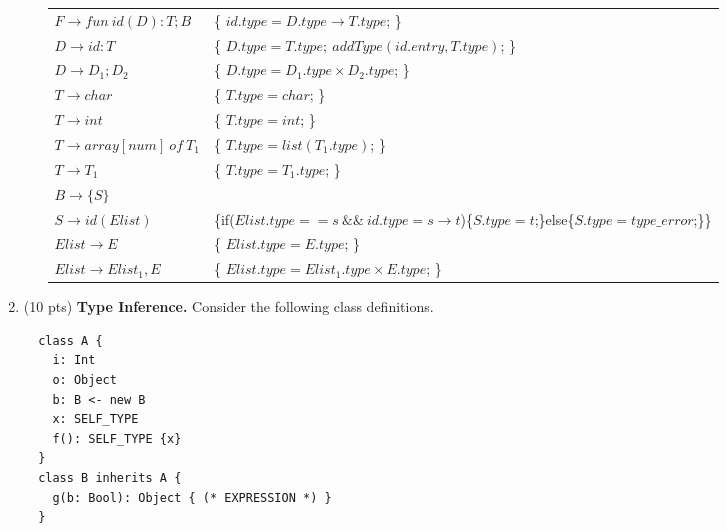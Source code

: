 \documentclass[10pt]{article}
\begin{document}
\begin{enumerate}
\begin{itemize}
{                        \begin{tabular}{ll}
                            $F \rightarrow fun\ id(D):T;B$      & \{ $id.type=D.type\rightarrow T.type$; \}                                                         \\
                            $D \rightarrow id:T$                & \{ $D.type=T.type;\ addType(id.entry,T.type)$; \}                                                 \\
                            $D \rightarrow D_1;D_2$             & \{ $D.type=D_1.type\times D_2.type$; \}                                                           \\
                            $T \rightarrow char$                & \{ $T.type=char$; \}                                                                              \\
                            $T \rightarrow int$                 & \{ $T.type=int$; \}                                                                               \\
                            $T \rightarrow array[num]\ of\ T_1$ & \{ $T.type=list(T_1.type)$; \}                                                                    \\
                            $T \rightarrow T_1$                 & \{ $T.type=T_1.type$; \}                                                                          \\
                            $B \rightarrow \{S\}$               &                                                                                                   \\
                            $S \rightarrow id(Elist)$           & \{if($Elist.type==s\ \&\&\ id.type=s\rightarrow t$)\{$S.type=t$;\}else\{$S.type=type\_error$;\}\} \\
                            $Elist \rightarrow E$               & \{ $Elist.type=E.type$; \}                                                                        \\
                            $Elist \rightarrow Elist_1,E$       & \{ $Elist.type=Elist_1.type\times E.type$; \}                                                     \\
                        \end{tabular}
                    }
          \end{itemize}

    \item (10 pts) \textbf{Type Inference.} Consider the following class definitions.
          \begin{verbatim}
  class A {
    i: Int
    o: Object
    b: B <- new B
    x: SELF_TYPE
    f(): SELF_TYPE {x}
  }
  class B inherits A {
    g(b: Bool): Object { (* EXPRESSION *) }
  }
\end{verbatim}


\end{enumerate}
\end{document}
